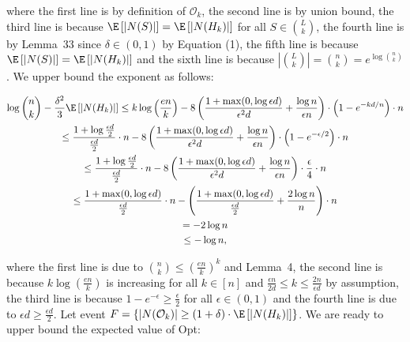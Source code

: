 where the first line is by definition of $\mathcal{O}_{k}$, the second line is by union bound, the third line is because $\E\left[|N(S)|\right]=\E\left[|N(H_{k})|\right]$ for all $S\in\binom{L}{k}$, the fourth line is by Lemma 33 since $\delta\in(0,1)$ by Equation (1), the fifth line is because $\E\left[|N(S)|\right]=\E\left[|N(H_{k})|\right]$ and the sixth line is because $|\binom{L}{k}|=\binom{n}{k}=e^{\log{\binom{n}{k}}}$.
We upper bound the exponent as follows:\par


\[\begin{gathered}
\displaystyle\log{\binom{n}{k}}-\frac{\delta^{2}}{3}\E\left[|N(H_{k})|\right] \displaystyle\leq k\log\left(\frac{en}{k}\right)-8\left(\frac{1+\max(0,\log{\epsilon d})}{\epsilon^{2}d}+\frac{\log{n}}{\epsilon n}\right)\cdot\left(1-e^{-kd/n}\right)\cdot n \\
\displaystyle\leq\frac{1+\log{\frac{\epsilon d}{2}}}{\frac{\epsilon d}{2}}\cdot n-8\left(\frac{1+\max(0,\log{\epsilon d})}{\epsilon^{2}d}+\frac{\log{n}}{\epsilon n}\right)\cdot\left(1-e^{-\epsilon/2}\right)\cdot n \\
\displaystyle\leq\frac{1+\log{\frac{\epsilon d}{2}}}{\frac{\epsilon d}{2}}\cdot n-8\left(\frac{1+\max(0,\log{\epsilon d})}{\epsilon^{2}d}+\frac{\log{n}}{\epsilon n}\right)\cdot\frac{\epsilon}{4}\cdot n \\
\displaystyle\leq\frac{1+\max(0,\log{\epsilon d})}{\frac{\epsilon d}{2}}\cdot n-\left(\frac{1+\max(0,\log{\epsilon d})}{\frac{\epsilon d}{2}}+\frac{2\log{n}}{n}\right)\cdot n \\
\displaystyle=-2\log{n} \\
\displaystyle\leq-\log{n},
\end{gathered}\]


where the first line is due to $\binom{n}{k}\leq\left(\frac{en}{k}\right)^{k}$ and Lemma 4, the second line is because $k\log\left(\frac{en}{k}\right)$ is increasing for all $k\in[n]$ and $\frac{\epsilon n}{2d}\leq k\leq\frac{2n}{\epsilon d}$ by assumption, the third line is because $1-e^{-\epsilon}\geq\frac{\epsilon}{2}$ for all $\epsilon\in(0,1)$ and the fourth line is due to $\epsilon d\geq\frac{\epsilon d}{2}$.
Let event $F=\{|N(\mathcal{O}_{k})|\geq(1+\delta)\cdot\E\left[|N(H_{k})|\right]\}$.
We are ready to upper bound the expected value of Opt:\par


